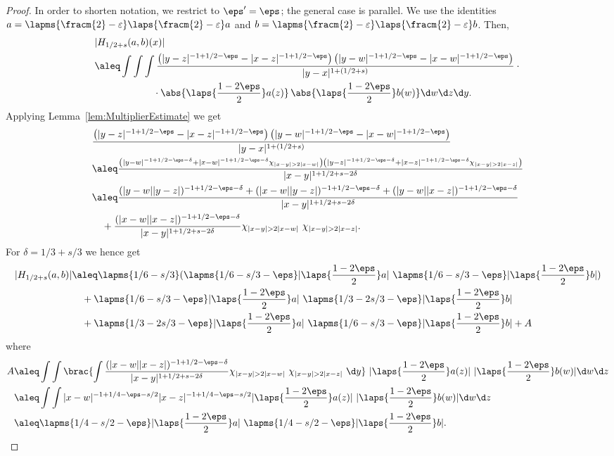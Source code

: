\begin{proof}
In order to shorten notation, we restrict to $\eps'=\eps$;
the general case is parallel.
 We use the identities $a=\lapms{\fracm{2}-\varepsilon}  \laps{\fracm{2}-\varepsilon}a$ and $b = \lapms{\fracm{2}-\varepsilon}  \laps{\fracm{2}-\varepsilon} b$.
 Then,
\begin{align*}
 &|H_{1/2+s}(a,b)(x)| \\&\aleq \int \int \int \frac {\left(|y-z|^{-1+1/2-\eps}-|x-z|^{-1+1/2-\eps} \right) 
  \left( |y-w|^{-1+1/2-\eps} - |x-w|^{-1+1/2-\eps} \right)}{|y-x|^{1+ (1/2+s)}}\cdot{}\\
  &\qquad\qquad\qquad{}\cdot\abs{\laps{\frac{1-2\eps}2} a(z)} \,\abs{\laps{\frac{1-2\eps}2} b(w)} \d w \d z \d y .
\end{align*}
Applying Lemma~\ref{lem:MultiplierEstimate} we get
\begin{align*}
 & \frac {\left(|y-z|^{-1+1/2-\eps}-|x-z|^{-1+1/2-\eps} \right) 
  \left( |y-w|^{-1+1/2-\eps} - |x-w|^{-1+1/2-\eps} \right)}{|y-x|^{1+ (1/2+s)}} \\
 &\aleq \frac {\scriptstyle\left(|y-w|^{-1+1/2-\eps-\delta} + |x-w|^{-1+1/2-\eps-\delta} \chi_{|x-y|>2|x-w|} \right) 
		\left(|y-z|^{-1+1/2-\eps-\delta} + |x-z|^{-1+1/2-\eps-\delta} \chi_{|x-y|>2|x-z|} \right)}
	     {|x-y|^{1+1/2+s-2\delta}} \\
 &\aleq \frac {(|y-w||y-z|)^{-1+1/2-\eps-\delta} + (|x-w||y-z|)^{-1+1/2-\eps-\delta}  
  + (|y-w||x-z|)^{-1+1/2-\eps-\delta}}{|x-y|^{1+1/2+s-2\delta}} \\
 & \quad{} + \frac {(|x-w||x-z|)^{-1+1/2-\eps-\delta}}{|x-y|^{1+1/2+s-2\delta}}
    \chi_{|x-y|>2|x-w|} \ \chi_{|x-y|>2|x-z|}.
\end{align*}
For $\delta =1/3 + s/3$ we hence get
\begin{align*}
 |H_{1/2+s}(a,b)|& \aleq \lapms{1/6-s/3} (\lapms{1/6-s/3-\eps}|\laps{\frac{1-2\eps}2} a| \ \lapms{1/6-s/3-\eps}|\laps{\frac{1-2\eps}2} b|) 
  \\ & \quad+\lapms{1/6-s/3-\eps}|\laps{\frac{1-2\eps}2} a|  \ \lapms{1/3-2s/3-\eps}|\laps{\frac{1-2\eps}2} b|
  \\ &\quad+ \lapms{1/3-2s/3-\eps}|\laps{\frac{1-2\eps}2} a| \ \lapms{1/6-s/3-\eps}|\laps{\frac{1-2\eps}2} b|
  + A
\end{align*}
where
\begin{align*}
 A &\aleq \int \int \brac{\int \frac {(|x-w||x-z|)^{-1+1/2-\eps-\delta}}{|x-y|^{1+1/2+s-2\delta}}
    \chi_{|x-y|>2|x-w|} \  \chi_{|x-y|>2|x-z|}\ \d y} \	 |\laps{\frac{1-2\eps}2}  a(z)|\ |\laps{\frac{1-2\eps}2}  b(w)| \d w \d z \\
   &\aleq \int \int   |x-w|^{-1+1/4-\eps-s/2 } |x-z|^{-1+1/4-\eps-s/2} |\laps{\frac{1-2\eps}2}  a(z)|\ |\laps{\frac{1-2\eps}2}  b(w)| \d w \d z \\
   &\aleq \lapms{1/4-s/2-\eps}|\laps{\frac{1-2\eps}2} a|\ \lapms{1/4-s/2-\eps}| \laps{\frac{1-2\eps}2} b|. \qedhere
\end{align*}
\end{proof}


